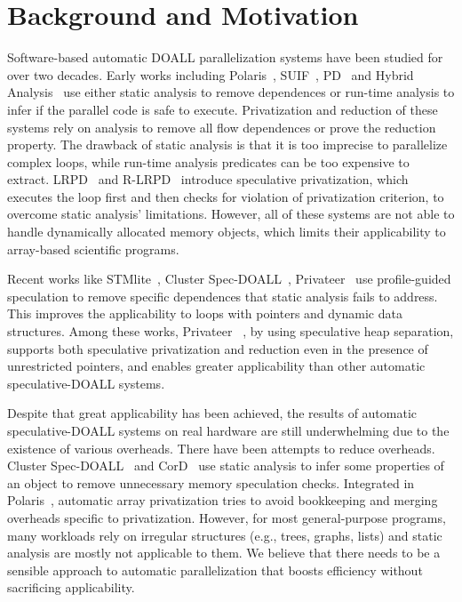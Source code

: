 \section{Background and Motivation}
\label{sec:motivation}


Software-based automatic DOALL parallelization systems have been studied
for over two decades.
%
Early works including Polaris~\cite{blume:94:polaris},
SUIF~\cite{suif:94:stanford}, PD~\cite{rauchwerger:94:ics} and Hybrid
Analysis~\cite{rus:03:hybrid} use either static analysis to remove
dependences or run-time analysis to infer if the parallel code is safe to
execute. Privatization and reduction of these systems rely on
analysis to remove all flow dependences or prove the reduction property.
The drawback of static analysis is that it is too imprecise to parallelize
complex loops, while run-time analysis predicates can be too expensive to
extract. LRPD~\cite{dang:02:ipdps} and R-LRPD~\cite{dang:02:ipdps}
introduce speculative privatization, which executes the loop first and then
checks for violation of privatization criterion, to overcome static
analysis' limitations. However, all of these systems are not able to handle
dynamically allocated memory objects, which limits their applicability to
array-based scientific programs.

Recent works like STMlite~\cite{mehrara:09:stmlite}, Cluster
Spec-DOALL~\cite{kim:12:cgo}, Privateer~\cite{johnson:12:pldi} use
profile-guided speculation to remove specific dependences that static
analysis fails to address. This improves the applicability to loops with
pointers and dynamic data structures.  Among these works, Privateer
~\cite{johnson:12:pldi}, by using speculative heap separation, supports
both speculative privatization and reduction even in the presence of
unrestricted pointers, and enables greater applicability than other
automatic speculative-DOALL systems.

Despite that great applicability has been achieved, the results of
automatic speculative-DOALL systems on real hardware are still
underwhelming due to the existence of various overheads. There have been
attempts to reduce overheads. Cluster Spec-DOALL~\cite{kim:12:cgo} and
CorD~\cite{ctian:2008:micro} use static analysis to infer some properties
of an object to remove unnecessary memory speculation checks. Integrated in
Polaris~\cite{blume:94:polaris}, automatic array
privatization\cite{tu:94:lcpc} tries to avoid bookkeeping and merging
overheads specific to privatization. However, for most general-purpose
programs, many workloads rely on irregular structures (e.g., trees, graphs,
lists) and static analysis are mostly not applicable to them. We believe
that there needs to be a sensible approach to automatic parallelization
that boosts efficiency without sacrificing applicability.


